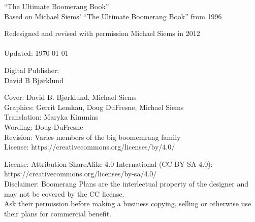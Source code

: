 ``The Ultimate Boomerang Book''\\

Based on Michael Siems' ``The Ultimate Boomerang Book'' from 1996\\
\vspace{2em}

Redesigned and revised with permission Michael Siems in 2012\\
\bookversion\\
Updated: \today \\
\vspace{2em}

Digital Publisher:\\
David B Bjørklund\\


\vspace{2em}

Cover: David B. Bjørklund, Michael Siems\\
Graphics: Gerrit Lemkau, Doug DuFresne, Michael Siems\\
Translation: Maryka Kimmins\\
Wording: Doug DuFresne\\
Revision: Varies members of the big boomemrang family\\

\vfill
License: https://creativecommons.org/licenses/by/4.0/

License: Attribution-ShareAlike 4.0 International (CC BY-SA 4.0):\\
https://creativecommons.org/licenses/by-sa/4.0/\\

Disclaimer: Boomerang Plans are the interlectual property of the designer and may not be covered by the CC license.\\ Ask their permission before making a business copying, selling or otherwise use their plans for commercial benefit.
\\
\newpage
